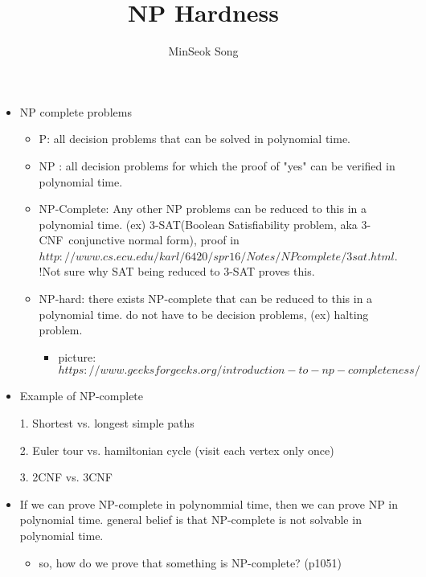 \documentclass{article}
\title{NP Hardness}
\author{MinSeok Song}
\date{}
\theoremstyle{remark}
\begin{document}
\maketitle 
\begin{itemize}
\item NP complete problems
\begin{itemize}
\item P:
all decision problems that can be solved in polynomial time.

\item NP
: all decision problems for which the proof of "yes" can be verified in polynomial time.

\item NP-Complete: Any other NP problems can be reduced to this in a polynomial time. (ex) 3-SAT(Boolean Satisfiability problem, aka 3-CNF~conjunctive normal form), proof in $http://www.cs.ecu.edu/karl/6420/spr16/Notes/NPcomplete/3sat.html$. !Not sure why SAT being reduced to 3-SAT proves this.

\item NP-hard: there exists NP-complete that can be reduced to this in a polynomial time. do not have to be decision problems, (ex) halting problem.

\begin{itemize}
\item picture: $https://www.geeksforgeeks.org/introduction-to-np-completeness/$
\end{itemize}
\end{itemize}
\item Example of NP-complete

1. Shortest vs. longest simple paths

2. Euler tour vs. hamiltonian cycle (visit each vertex only once)

3. 2CNF vs. 3CNF
\item If we can prove NP-complete in polynommial time, then we can prove NP in polynomial time. general belief is that NP-complete is not solvable in polynomial time.
\begin{itemize}
\item so, how do we prove that something is NP-complete? (p1051)
\end{itemize}





\end{itemize}
\end{document}

